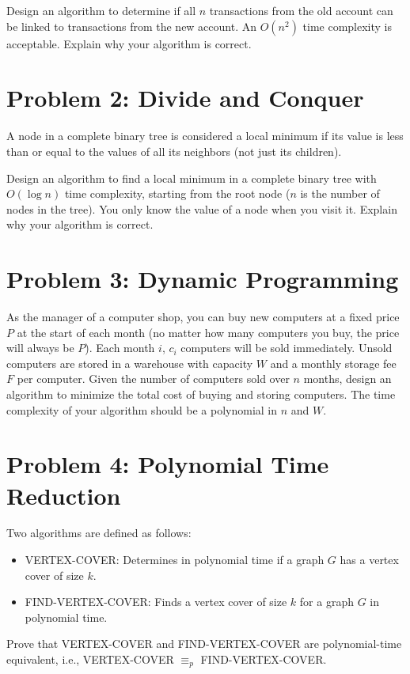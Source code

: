 \documentclass[a4paper,12pt]{article}
\begin{document}
Design an algorithm to determine if all $n$ transactions from the old account can be linked to transactions from the new account. An $O(n^2)$ time complexity is acceptable. Explain why your algorithm is correct.

\section*{Problem 2: Divide and Conquer}

A node in a complete binary tree is considered a local minimum if its value is less than or equal to the values of all its neighbors (not just its children).

Design an algorithm to find a local minimum in a complete binary tree with $O(\log n)$ time complexity, starting from the root node ($n$ is the number of nodes in the tree). You only know the value of a node when you visit it. Explain why your algorithm is correct.

\section*{Problem 3: Dynamic Programming}

As the manager of a computer shop, you can buy new computers at a fixed price $P$ at the start of each month (no matter how many computers you buy, the price will always be $P$). Each month $i$, $c_i$ computers will be sold immediately. Unsold computers are stored in a warehouse with capacity $W$ and a monthly storage fee $F$ per computer. Given the number of computers sold over $n$ months, design an algorithm to minimize the total cost of buying and storing computers. The time complexity of your algorithm should be a polynomial in $n$ and $W$.

\newpage
\section*{Problem 4: Polynomial Time Reduction}

Two algorithms are defined as follows:
\begin{itemize}
  \item VERTEX-COVER: Determines in polynomial time if a graph $G$ has a vertex cover of size $k$.
  \item FIND-VERTEX-COVER: Finds a vertex cover of size $k$ for a graph $G$ in polynomial time.
\end{itemize}

Prove that VERTEX-COVER and FIND-VERTEX-COVER are polynomial-time equivalent, i.e., VERTEX-COVER $\equiv_p$ FIND-VERTEX-COVER.
\end{document}
